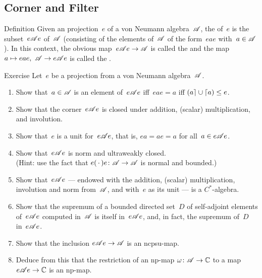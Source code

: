 \documentclass[a]{subfiles}
\begin{document}
\subsection{Corner and Filter}
\begin{parsec}%
\begin{point}{Definition}%
Given an projection~$e$ of a von Neumann algebra~$\mathscr{A}$,
the  of~$e$
is the subset~$e\mathscr{A} e$ of~$\mathscr{A}$ 
(consisting of the elements of~$\mathscr{A}$
of the form~$eae$ with~$a\in\mathscr{A}$).
In this context,
the obvious map~$e\mathscr{A} e\to\mathscr{A}$
is called the 
and the map $a\mapsto eae,\ \scrA\to e\scrA e$
is called the .
\end{point}
\begin{point}{Exercise}%
Let~$e$ be a projection from a von Neumann algebra~$\mathscr{A}$.
\begin{enumerate}
\item
Show that~$a\in\mathscr{A}$ 
is an element of~$e\mathscr{A} e$ iff~$eae=a$
iff $\left(a\right\rceil\cup\left\lceil a\right) \leq e$.
\item
Show that the corner~$e\mathscr{A} e$
is closed under addition, (scalar) multiplication,
and involution.
\item
Show that~$e$ is a unit for~$e\mathscr{A} e$,
that is, $ea=ae=a$ for all~$a\in e\mathscr{A} e$.
\item
Show that~$e\mathscr{A} e$ is norm and ultraweakly closed.\\
(Hint: use the fact that $e(\,\cdot\,)e\colon \mathscr{A}\to\mathscr{A}$
is normal and bounded.)
\item
Show that~$e\mathscr{A} e$ --- 
endowed with the addition, (scalar) multiplication,
involution and norm from~$\mathscr{A}$,
and with~$e$ as its unit ---  is a $C^*$-algebra.
\item
Show that the supremum of a bounded directed
set~$D$ of self-adjoint elements of~$e\mathscr{A} e$
computed in~$\mathscr{A}$
is itself in~$e\mathscr{A} e$,
and, in fact, the supremum of~$D$ in~$e\mathscr{A} e$.
\item
Show that the inclusion $e\mathscr{A} e\to\mathscr{A}$
is an ncpsu-map.
\item
Deduce from this that the restriction of an np-map
$\omega\colon \mathscr{A}\to\mathbb{C}$ to
a map $e\mathscr{A} e\to\mathbb{C}$
is an np-map.


\end{enumerate}
\end{point}
\end{parsec}
\end{document}
